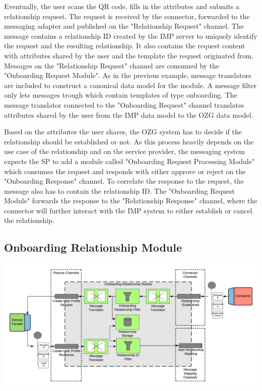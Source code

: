 Eventually, the user scans the QR code, fills in the attributes and submits a relationship request. The request is received by the connector, forwarded to the messaging adapter and published on the "Relationship Request" channel. The message contains a relationship ID created by the IMP server to uniquely identify the request and the resulting relationship. It also contains the request content with attributes shared by the user and the template the request originated from. Messages on the "Relationship Request" channel are consumed by the "Onboarding Request Module". As in the previous example, message translators are included to construct a canonical data model for the module. A message filter only lets messages trough which contain templates of type onboarding. The message translator connected to the "Onboarding Request" channel translates attributes shared by the user from the IMP data model to the OZG data model.

Based on the attributes the user shares, the OZG system has to decide if the relationship should be established or not. As this process heavily depends on the use case of the relationship and on the service provider, the messaging system expects the SP to add a module called "Onboarding Request Processing Module" which consumes the request and responds with either approve or reject on the "Onboarding Response" channel. To correlate the response to the request, the message also has to contain the relationship ID. The "Onboarding Request Module" forwards the response to the "Relationship Response" channel, where the connector will further interact with the IMP system to either establish or cancel the relationship.

\subsection{Onboarding Relationship Module}

\begin{center}
    \includegraphics[scale=0.6]{Diagrams/Integration Architecture 1/Technological Integration/8. Onboarding Relationship Module.pdf}
\end{center}

